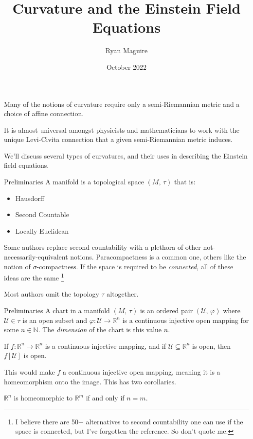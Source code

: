 \documentclass{beamer}
\title{Curvature and the Einstein Field Equations}
\author{Ryan Maguire}
\date{October 2022}
\begin{document}
    \maketitle
    \begin{frame}
        Many of the notions of curvature require only a semi-Riemannian metric
        and a choice of affine connection.
        \par\hfill\par
        It is almost universal amongst physicists and mathematicians to work
        with the unique Levi-Civita connection that a given semi-Riemannian
        metric induces.
        \par\hfill\par
        We'll discuss several types of curvatures, and their uses in
        describing the Einstein field equations.
    \end{frame}
    \begin{frame}{Preliminaries}
        A manifold is a topological space $(M,\,\tau)$ that is:
        \begin{itemize}
            \item Hausdorff
            \item Second Countable
            \item Locally Euclidean
        \end{itemize}
        Some authors replace second countability with a plethora of other
        not-necessarily-equivalent notions. Paracompactness is a common one,
        others like the notion of $\sigma\textrm{-compactness}$. If the space
        is required to be \textit{connected}, all of these ideas are the same%
        \footnote{I believe there are 50+ alternatives to second countability
                  one can use if the space is connected, but I've forgotten the
                  reference. So don't quote me.}
        \par\hfill\par
        Most authors omit the topology $\tau$ altogether.
    \end{frame}
    \begin{frame}{Preliminaries}
        A chart in a manifold $(M,\,\tau)$ is an ordered pair
        $(\mathcal{U},\,\varphi)$ where $\mathcal{U}\in\tau$ is an open subset
        and $\varphi:\mathcal{U}\rightarrow\mathbb{R}^{n}$ is a continuous
        injective open mapping for some $n\in\mathbb{N}$. The \textit{dimension}
        of the chart is this value $n$.
        \begin{theorem}
            If $f:\mathbb{R}^{n}\rightarrow\mathbb{R}^{n}$ is a continuous
            injective mapping, and if $\mathcal{U}\subseteq\mathbb{R}^{n}$ is
            open, then $f[\mathcal{U}]$ is open.
        \end{theorem}
        This would make $f$ a continuous injective open mapping, meaning it is
        a homeomorphism onto the image. This has two corollaries.
        \begin{theorem}
            $\mathbb{R}^{n}$ is homeomorphic to $\mathbb{R}^{m}$ if and only if
            $n=m$.
        \end{theorem}
    \end{frame}
\end{document}
